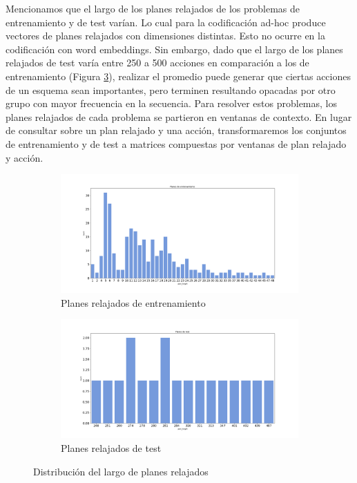 Mencionamos que el largo de los planes relajados de los problemas de
entrenamiento y de test varían. Lo cual para la codificación ad-hoc produce
vectores de planes relajados con dimensiones distintas. Esto no ocurre en la
codificación con word embeddings. Sin embargo, dado que el largo de los planes
relajados de test varía entre 250 a 500 acciones en comparación a los de
entrenamiento (Figura \ref{fig:plan-length-distplot}), realizar el promedio
puede generar que ciertas acciones de un esquema sean importantes, pero terminen
resultando opacadas por otro grupo con mayor frecuencia en la secuencia. Para
resolver estos problemas, los planes relajados de cada problema se partieron en
ventanas de contexto. En lugar de consultar sobre un plan relajado y una acción,
transformaremos los conjuntos de entrenamiento y de test a matrices compuestas por
ventanas de plan relajado y acción.

\begin{figure}[t!]
    \begin{subfigure}[b]{\textwidth}
        \centering
        \includegraphics[width=\linewidth]{figures/plan_length_distplot_train.png}
        \caption{Planes relajados de entrenamiento}
        \label{fig:plan-length-distplot-train}
    \end{subfigure}
    \begin{subfigure}[b]{\textwidth}
        \centering
        \includegraphics[width=\linewidth]{figures/plan_length_distplot_test.png}
        \caption{Planes relajados de test}
        \label{fig:plan-length-distplot-test}
    \end{subfigure}
    \caption{Distribución del largo de planes relajados}
    \label{fig:plan-length-distplot}
\end{figure}

